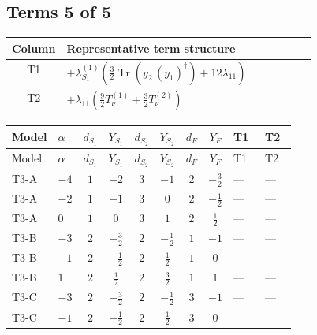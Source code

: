 \documentclass[8pt]{article}
\begin{document}
\begin{landscape}
\subsection*{Terms 5 of 5}
\begin{center}
\begin{tabular}{@{}c >{\raggedright\arraybackslash}p{0.82\linewidth}@{}}
\toprule
Column & Representative term structure \\
\midrule
T1 & \(\displaystyle +{\lambda_{S_1}^{(1)}} \left(\frac{3}{2} \operatorname{Tr}\!\left({y_2}\,\left({y_1}\right)^{\dagger}\right)+12 {\lambda_{11}}\right)\) \\
\midrule
T2 & \(\displaystyle +{\lambda_{11}} \left(\frac{9}{2} T_{\nu}^{(1)}+\frac{3}{2} T_{\nu}^{(2)}\right)\) \\
\midrule
\bottomrule
\end{tabular}
\end{center}
\smallskip
\tiny
\begin{longtable}{@{}llcccccc >{\raggedright\arraybackslash}p{0.21\linewidth} >{\raggedright\arraybackslash}p{0.21\linewidth}@{}}
\toprule
Model & $\alpha$ & $d_{S_1}$ & $Y_{S_1}$ & $d_{S_2}$ & $Y_{S_2}$ & $d_F$ & $Y_F$ & T1 & T2 \\
\midrule
\endfirsthead
\toprule
Model & $\alpha$ & $d_{S_1}$ & $Y_{S_1}$ & $d_{S_2}$ & $Y_{S_2}$ & $d_F$ & $Y_F$ & T1 & T2 \\
\midrule
\endhead
T3-A & $-4$ & $1$ & $-2$ & $3$ & $-1$ & $2$ & $-\frac{3}{2}$ & --- & --- \\
\midrule
T3-A & $-2$ & $1$ & $-1$ & $3$ & $0$ & $2$ & $-\frac{1}{2}$ & --- & --- \\
\midrule
T3-A & $0$ & $1$ & $0$ & $3$ & $1$ & $2$ & $\frac{1}{2}$ & --- & --- \\
\midrule
T3-B & $-3$ & $2$ & $-\frac{3}{2}$ & $2$ & $-\frac{1}{2}$ & $1$ & $-1$ & --- & --- \\
\midrule
T3-B & $-1$ & $2$ & $-\frac{1}{2}$ & $2$ & $\frac{1}{2}$ & $1$ & $0$ & --- & --- \\
\midrule
T3-B & $1$ & $2$ & $\frac{1}{2}$ & $2$ & $\frac{3}{2}$ & $1$ & $1$ & --- & --- \\
\midrule
T3-C & $-3$ & $2$ & $-\frac{3}{2}$ & $2$ & $-\frac{1}{2}$ & $3$ & $-1$ & --- & --- \\
\midrule
T3-C & $-1$ & $2$ & $-\frac{1}{2}$ & $2$ & $\frac{1}{2}$ & $3$ & $0$ & \scriptsize\adjustbox{max width=\linewidth}{$\begin{gathered} +{\lambda_{S_1}^{(1)}} \left(\frac{3}{2} \operatorname{Tr}\!\left({y_2}\,\left({y_1}\right)^{\dagger}\right)+12 {\lambda_{11}}\right)\end{gathered}$} & \scriptsize\adjustbox{max width=\linewidth}{$\begin{gathered} +{\lambda_{11}} \left(\frac{9}{2} T_{\nu}^{(1)}+\frac{3}{2} T_{\nu}^{(2)}\right)\end{gathered}$} \\

\end{longtable}
\end{landscape}
\end{document}

